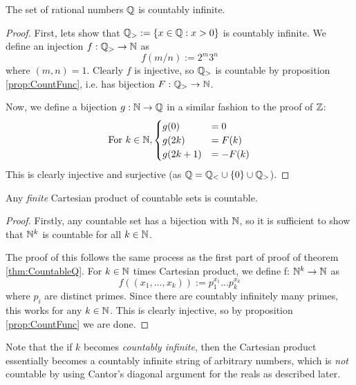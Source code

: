 \documentclass[11pt]{article}
\begin{document}
\begin{theorem}[\(\Q\) is countable][CountableQ]
  The set of rational numbers \(\Q\) is countably infinite.
\end{theorem}
\begin{proof}
  First, lets show that \(\mathbb{Q}_>:=\{x\in\mathbb{Q}:x>0\}\) is countably infinite. We define an injection \(f:\mathbb{Q}_> \to \mathbb{N}\) as
  \begin{equation*}
    f(m/n):=2^m3^n
  \end{equation*}
  where \((m,n)=1\). Clearly \(f\) is injective, so \(\mathbb{Q}_>\) is countable by proposition \ref{prop:CountFunc}, i.e. has bijection \(F:\mathbb{Q}_>\to\mathbb{N}\).

  Now, we define a bijection \(g:\mathbb{N} \to \mathbb{Q}\) in a similar fashion to the proof of \(\mathbb{Z}\):
  \[\text{For } k\in \mathbb{N},\begin{cases}
    g(0)&=0 \\
    g(2k)&=F(k)\\
    g(2k+1)&=-F(k)
  \end{cases}\]
  This is clearly injective and surjective (as \(\mathbb{Q} = \mathbb{Q}_<\cup\{0\}\cup\mathbb{Q}_>\)).
\end{proof}

\begin{corollary}
  \label{CountableCarte}
  Any \emph{finite} Cartesian product of countable sets is countable.
\end{corollary}
\begin{proof}
  Firstly, any countable set has a bijection with \(\mathbb{N}\), so it is sufficient to show that \(\mathbb{N}^k\) is countable for all \(k\in\mathbb{N}\).

  The proof of this follows the same process as the first part of proof of theorem \ref{thm:CountableQ}. For \(k\in\mathbb{N}\) times Cartesian product, we define f: \(\mathbb{N}^k \to \mathbb{N}\) as 
  \begin{equation*}
    f((x_1,...,x_k)):=p_1^{x_1}...p_k^{x_k}
  \end{equation*}
  where \(p_i\) are distinct primes. Since there are countably infinitely many primes, this works for any \(k \in \mathbb{N}\). This is clearly injective, so by proposition \ref{prop:CountFunc} we are done. 
\end{proof}
\begin{remark}
  Note that the if \(k\) becomes \emph{countably infinite}, then the Cartesian product essentially becomes a countably infinite string of arbitrary numbers, which is \emph{not} countable by using Cantor's diagonal argument for the reals as described later.
\end{remark}
\end{document}
